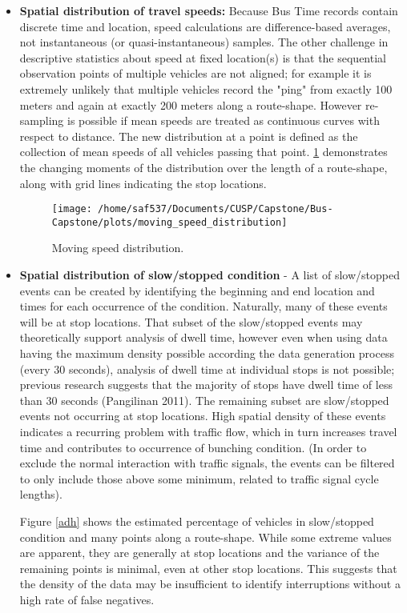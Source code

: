 \documentclass[12pt]{report}
\begin{document}
\begin{itemize}
\item \textbf{Spatial distribution of travel speeds:} Because Bus Time records contain discrete time and location, speed calculations are difference-based averages, not instantaneous (or quasi-instantaneous) samples.  The other challenge in descriptive statistics about speed at fixed location(s) is that the sequential observation points of multiple vehicles are not aligned; for example it is extremely unlikely that multiple vehicles record the "ping" from exactly 100 meters and again at exactly 200 meters along a route-shape.  However re-sampling is possible if mean speeds are treated as continuous curves with respect to distance.  The new distribution at a point is defined as the collection of mean speeds of all vehicles passing that point.  \ref{msd} demonstrates the changing moments of the distribution over the length of a route-shape, along with grid lines indicating the stop locations.

\begin{center}
\begin{figure}[!ht]
  \caption{Moving speed distribution.}
  \label{msd}
  \centering
    \texttt{[image: /home/saf537/Documents/CUSP/Capstone/Bus-Capstone/plots/moving\_speed\_distribution]}
\end{figure}
\end{center}

\item \textbf{Spatial distribution of slow/stopped condition} - A list of slow/stopped events can be created by identifying the beginning and end location and times for each occurrence of the condition.  Naturally, many of these events will be at stop locations.   That subset of the slow/stopped events may theoretically support analysis of dwell time, however even when using data having the maximum density possible according the data generation process (every 30 seconds), analysis of dwell time at individual stops is not possible; previous research suggests that the majority of stops have dwell time of less than 30 seconds (Pangilinan 2011).  The remaining subset are slow/stopped events not occurring at stop locations.  High spatial density of these events indicates a recurring problem with traffic flow, which in turn increases travel time and contributes to occurrence of bunching condition.  (In order to exclude the normal interaction with traffic signals, the events can be filtered to only include those above some minimum, related to traffic signal cycle lengths).

Figure \ref{adh} shows the estimated percentage of vehicles in slow/stopped condition and many points along a route-shape.  While some extreme values are apparent, they are generally at stop locations and the variance of the remaining points is minimal, even at other stop locations.  This suggests that the density of the data may be insufficient to identify interruptions without a high rate of false negatives.




\end{itemize}
\end{document}

